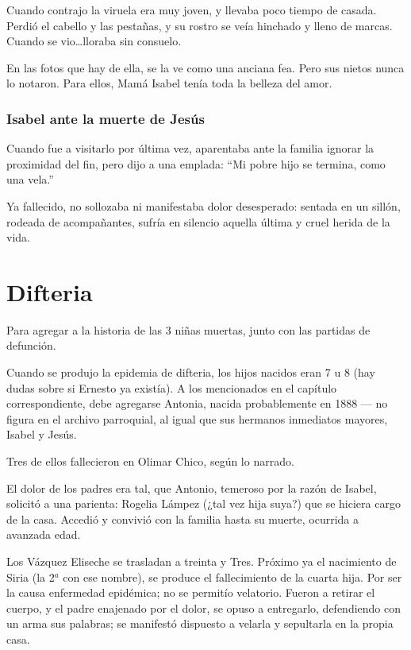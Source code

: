 \documentclass{article}
\begin{document}
\bigbreak{}

Cuando contrajo la viruela era muy joven, y llevaba poco tiempo de casada. Perdió el cabello y las pestañas, y su rostro se veía hinchado y lleno de marcas. Cuando se vio\ldots lloraba sin consuelo.

En las fotos que hay de ella, se la ve como una anciana fea. Pero sus nietos nunca lo notaron. Para ellos, Mamá Isabel tenía toda la belleza del amor.

\subsubsection{Isabel ante la muerte de Jesús}

Cuando fue a visitarlo por última vez, aparentaba ante la familia ignorar la proximidad del fin, pero dijo a una emplada: ``Mi pobre hijo se termina, como una vela.''

Ya fallecido, no sollozaba ni manifestaba dolor desesperado: sentada en un sillón, rodeada de acompañantes, sufría en silencio aquella última y cruel herida de la vida.

\section{Difteria}

Para agregar a la historia de las 3 niñas muertas, junto con las partidas de defunción.

Cuando se produjo la epidemia de difteria, los hijos nacidos eran 7 u 8 (hay dudas sobre si Ernesto ya existía). A los mencionados en el capítulo correspondiente, debe agregarse Antonia, nacida probablemente en 1888 --- no figura en el archivo parroquial, al igual que sus hermanos inmediatos mayores, Isabel y Jesús.

Tres de ellos fallecieron en Olimar Chico, según lo narrado.

El dolor de los padres era tal, que Antonio, temeroso por la razón de Isabel, solicitó a una parienta: Rogelia Lámpez (¿tal vez hija suya?) que se hiciera cargo de la casa. Accedió y convivió con la familia hasta su muerte, ocurrida a avanzada edad.

Los Vázquez Eliseche se trasladan a treinta y Tres. Próximo ya el nacimiento de Siria (la 2$^{a}$ con ese nombre), se produce el fallecimiento de la cuarta hija. Por ser la causa enfermedad epidémica; no se permitío velatorio. Fueron a retirar el cuerpo, y el padre enajenado por el dolor, se opuso a entregarlo, defendiendo con un arma sus palabras; se manifestó dispuesto a velarla y sepultarla en la propia casa.
\end{document}
